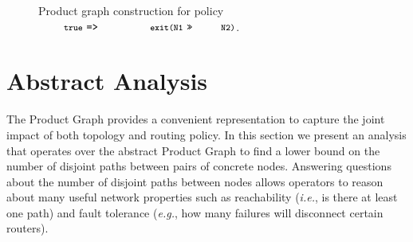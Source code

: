 \documentclass[numbers, 10pt, preprint]{sigplanconf}
\newcommand{\EG}{\emph{e.g.}}
\newcommand{\IE}{\emph{i.e.}}
\newcommand{\CD}[1]{\texttt{\small #1}}  %
\newcommand{\KW}[1]{\texttt{\small\bfseries{#1}}}
\newcommand{\True}{\CD{true}}
\newcommand{\Prefer}{\texttt{>>}}
\newcommand{\Path}{\texttt{=>}}
\newcommand{\Exit}{\KW{exit}}
\begin{document}
\begin{figure}[t!]
\begin{minipage}[t]{.4\linewidth}
  \end{minipage}%

  \hrulefill
  \vspace*{.4em}%

  \caption{Product graph construction for policy $\True ~\Path~ \CD{\Exit(\text{N1}} ~\Prefer~ \CD{\text{N2})}$.}
  \label{fig:example-compilation}
\end{figure}


%
%
%
%


\section{Abstract Analysis}
\label{sec:analysis}

The Product Graph provides a convenient representation to capture the joint impact of both topology and routing policy. In this section we present an analysis that operates over the abstract Product Graph to find a lower bound on the number of disjoint paths between pairs of concrete nodes. Answering questions about the number of disjoint paths between nodes allows operators to reason about many useful network properties such as reachability (\IE, is there at least one path) and fault tolerance (\EG, how many failures will disconnect certain routers).


\newcommand{\inference}[7]{
    \node[draw, anchor=west] at (#1 + .5, 2.5 / 2) {#3};
    \node[] at (#1, 2.5 / 2 + 2.5) {\textbf{#5}};
    \node at (#1 + .34, .6 + .2) {#6};
    \node at (#1 + .34, 1.9 - .2) {#7};
    \node at (#1, -.6) {#2};
    \node at (#1, 2.5 + .4 + .2) {#4};
    \draw [] (#1, 2.5 - .2) circle [radius=0.4] node {$n$};
    \draw [] (#1, .2) circle [radius=0.4] node {$m$};
    \draw [->] (#1, .4 + .2) -- (#1, 2.5 - .4 - .2);
}

\newcommand{\inferencenobox}[7]{
    \node[anchor=west] at (#1 + .1, 1.25) {#3};
    \node[] at (#1, 2.5 / 2 + 2.5) {\textbf{#5}};
    \node at (#1 + .34, .6) {#6};
    \node at (#1 + .34, 1.9) {#7};
    \node at (#1, -.6) {#2};
    \node at (#1, 2.5 + .4 + .2) {#4};
    \draw [] (#1, 2.5 - .2) circle [radius=0.4] node {$n$};
    \draw [] (#1, .2) circle [radius=0.4] node {$m$};
    \draw [->] (#1, .2 + .4) -- (#1, 2.5 - .4 - .2);
}
\end{document}
